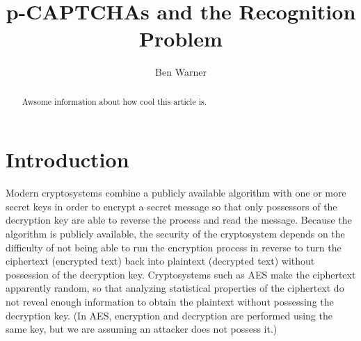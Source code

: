 \documentclass[12pt]{article}
\begin{document}
\title{p-CAPTCHAs and the Recognition Problem}
\author{Ben Warner}
\maketitle


% 

\begin{abstract}
Awsome information about how cool this article is.
\end{abstract}

\section*{Introduction}
	Modern cryptosystems combine a publicly available algorithm with one or more secret keys in order to encrypt a secret message so that only possessors of the decryption key are able to reverse the process and read the message. Because the algorithm is publicly available, the security of the cryptosystem depends on the difficulty of not being able to run the encryption process in reverse to turn the ciphertext (encrypted text) back into plaintext (decrypted text) without possession of the decryption key. Cryptosystems such as AES make the ciphertext apparently random, so that analyzing statistical properties of the ciphertext do not reveal enough information to obtain the plaintext without possessing the decryption key. (In AES, encryption and decryption are performed using the same key, but we are assuming an attacker does not possess it.)
\end{document}
